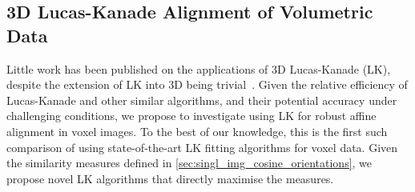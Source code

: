 \subsection{3D Lucas-Kanade Alignment of Volumetric Data}\label{subsec:singl_img_lk_3d}
Little work has been published on the applications of 3D Lucas-Kanade (LK),
despite the extension of LK into 3D being 
trivial~\cite{baker2005lk20yearsonpart5}. Given the
relative efficiency of Lucas-Kanade and other similar algorithms, and their
potential accuracy under challenging conditions, we propose to investigate using
LK for robust affine alignment in voxel images. To the best of our knowledge,
this is the first such comparison of using state-of-the-art LK fitting
algorithms for voxel data. Given the similarity measures defined in
\cref{sec:singl_img_cosine_orientations}, we propose novel LK algorithms
that directly maximise the measures.



